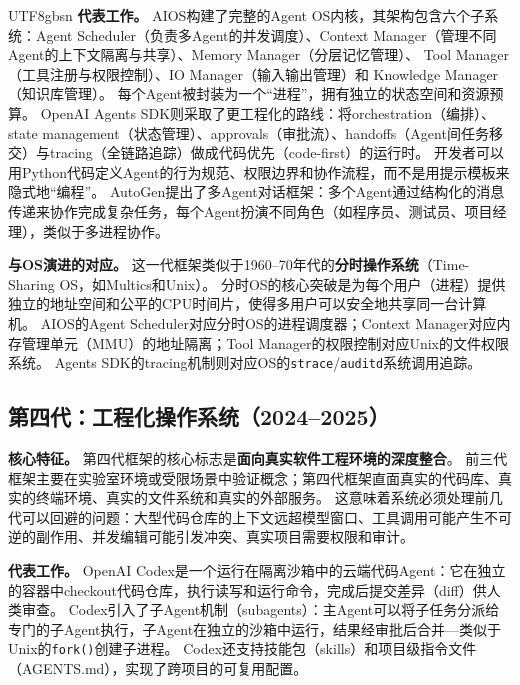 \documentclass[11pt,a4paper]{article}
\begin{document}
\begin{CJK*}{UTF8}{gbsn}
\textbf{代表工作。}
AIOS\cite{mei2024aios}构建了完整的Agent OS内核，其架构包含六个子系统：Agent Scheduler（负责多Agent的并发调度）、Context Manager（管理不同Agent的上下文隔离与共享）、Memory Manager（分层记忆管理）、 Tool Manager（工具注册与权限控制）、IO Manager（输入输出管理）和 Knowledge Manager（知识库管理）。
每个Agent被封装为一个``进程''，拥有独立的状态空间和资源预算。
OpenAI Agents SDK\cite{openai_codex_agentsdk_2026}则采取了更工程化的路线：将orchestration（编排）、state management（状态管理）、approvals（审批流）、handoffs（Agent间任务移交）与tracing（全链路追踪）做成代码优先（code-first）的运行时。
开发者可以用Python代码定义Agent的行为规范、权限边界和协作流程，而不是用提示模板来隐式地``编程''。
AutoGen\cite{wu2023autogen}提出了多Agent对话框架：多个Agent通过结构化的消息传递来协作完成复杂任务，每个Agent扮演不同角色（如程序员、测试员、项目经理），类似于多进程协作。

\textbf{与OS演进的对应。}
这一代框架类似于1960--70年代的\textbf{分时操作系统}（Time-Sharing OS，如Multics和Unix）。
分时OS的核心突破是为每个用户（进程）提供独立的地址空间和公平的CPU时间片，使得多用户可以安全地共享同一台计算机。
AIOS的Agent Scheduler对应分时OS的进程调度器；Context Manager对应内存管理单元（MMU）的地址隔离；Tool Manager的权限控制对应Unix的文件权限系统。
Agents SDK的tracing机制则对应OS的\texttt{strace}/\texttt{auditd}系统调用追踪。

\subsection*{第四代：工程化操作系统（2024--2025）}

\textbf{核心特征。}
第四代框架的核心标志是\textbf{面向真实软件工程环境的深度整合}。
前三代框架主要在实验室环境或受限场景中验证概念；第四代框架直面真实的代码库、真实的终端环境、真实的文件系统和真实的外部服务。
这意味着系统必须处理前几代可以回避的问题：大型代码仓库的上下文远超模型窗口、工具调用可能产生不可逆的副作用、并发编辑可能引发冲突、真实项目需要权限和审计。

\textbf{代表工作。}
OpenAI Codex\cite{openai_codex_overview_2026}是一个运行在隔离沙箱中的云端代码Agent：它在独立的容器中checkout代码仓库，执行读写和运行命令，完成后提交差异（diff）供人类审查。
Codex引入了子Agent机制（subagents）\cite{openai_codex_subagents_2026}：主Agent可以将子任务分派给专门的子Agent执行，子Agent在独立的沙箱中运行，结果经审批后合并---类似于Unix的\texttt{fork()}创建子进程。
Codex还支持技能包（skills）\cite{openai_codex_skills_2026}和项目级指令文件（AGENTS.md）\cite{openai_codex_agents_md_2026}，实现了跨项目的可复用配置。


\end{CJK*}
\end{document}
